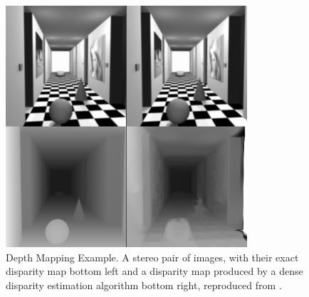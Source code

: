 \begin{figure}[H]
    \begin{center}
      \includegraphics[width=0.8\textwidth]{Figures/depthmap.png}
      \caption[Depth Mapping Example]{Depth Mapping Example. A stereo pair of images, with their exact disparity map bottom left and a disparity map produced by a dense disparity estimation algorithm bottom right, reproduced from \cite{deptheg}.}
      \label{fig:depthmap}
    \end{center}
\end{figure}